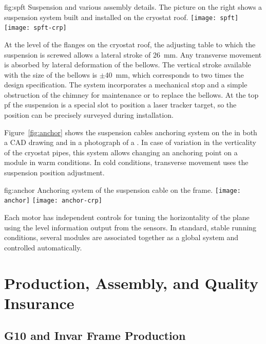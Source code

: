 \begin{dunefigure}{fig:spft}
{Suspension \fdth and various assembly details. The picture on the right shows a suspension system built and installed on the  cryostat roof.}
\texttt{[image: spft]}
\texttt{[image: spft-crp]}
\end{dunefigure}
At the level of the flanges on the cryostat roof, the adjusting table to which the suspension \fdth is screwed allows a lateral stroke of \SI{26}{mm}. Any transverse movement is absorbed by lateral deformation of the bellows.
The vertical stroke available with the  size of the bellows is $\pm$\SI{40}{mm}, which corresponds to two times the design specification.
The system incorporates a  mechanical stop and a simple obstruction of the chimney for maintenance or to replace the bellows.
At the top pf the suspension \fdth is a special slot to position a laser tracker target,
so the \fdth position can be precisely surveyed during installation.

Figure~\ref{fig:anchor} shows the suspension cables anchoring system on the  in both a CAD drawing and in a photograph of a . 
In case of variation in the verticality of the cryostat pipes, this system allows changing an anchoring point on a module in warm conditions. In cold conditions, transverse movement uses the suspension \fdth position adjustment.
\begin{dunefigure}{fig:anchor}
{Anchoring system of the suspension cable on the  frame.}
\texttt{[image: anchor]}
\texttt{[image: anchor-crp]}
\end{dunefigure}
Each motor has independent controls for tuning the horizontality of the plane using the level information output from the %
sensors. In standard, stable running conditions, several  modules are associated together as a global system and controlled automatically.

\section{Production, Assembly, and Quality Insurance}
\label{sec:dp-crp-prod-assy}

\subsection{G10 and Invar Frame Production}
\label{sec:dp-crp-frame}

